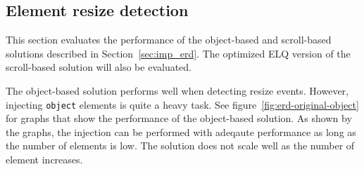 \documentclass[a4paper,11pt]{kth-mag}
\newcommand{\code}[1]{\texttt{#1}}
\begin{document}
      \subsection{Element resize detection}\label{sec:eval-perf-erd}
        This section evaluates the performance of the object-based and scroll-based solutions described in Section~\ref{sec:imp_erd}.
        The optimized \gls{ELQ} version of the scroll-based solution will also be evaluated.

        The object-based solution performs well when detecting resize events.
        However, injecting \code{object} elements is quite a heavy task.
        See figure~\ref{fig:erd-original-object} for graphs that show the performance of the object-based solution.
        As shown by the graphs, the injection can be performed with adeqaute performance as long as the number of elements is low.
        The solution does not scale well as the number of element increases.
\end{document}
